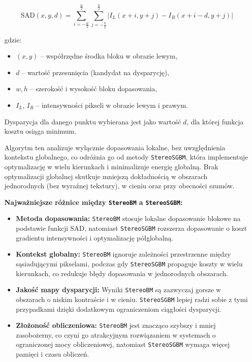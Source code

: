 \documentclass[magisterska]{pracadypl}
\begin{document}
\[
\text{SAD}(x,y,d) = \sum_{i=-\frac{w}{2}}^{\frac{w}{2}} \sum_{j=-\frac{h}{2}}^{\frac{h}{2}} | I_L(x+i,y+j) - I_R(x+i-d,y+j) |
\]

gdzie:
\begin{itemize}
    \item $(x,y)$ -- współrzędne środka bloku w obrazie lewym,
    \item $d$ -- wartość przesunięcia (kandydat na dysparycję),
    \item $w,h$ -- szerokość i wysokość bloku dopasowania,
    \item $I_L$, $I_R$ -- intensywności pikseli w obrazie lewym i prawym.
\end{itemize}

Dysparycja dla danego punktu wybierana jest jako wartość $d$, dla której funkcja kosztu osiąga minimum.  

Algorytm ten analizuje wyłącznie dopasowania lokalne, bez uwzględnienia kontekstu globalnego, co odróżnia go od metody \texttt{StereoSGBM}, która implementuje optymalizację w wielu kierunkach i minimalizuje energię globalną. Brak optymalizacji globalnej skutkuje mniejszą dokładnością w obszarach jednorodnych (bez wyraźnej tekstury), w cieniu oraz przy obecności szumów.  

\textbf{Najważniejsze różnice między \texttt{StereoBM} a \texttt{StereoSGBM}:}
\begin{itemize}
    \item \textbf{Metoda dopasowania:}  
    \texttt{StereoBM} stosuje lokalne dopasowanie blokowe na podstawie funkcji SAD, natomiast \texttt{StereoSGBM} rozszerza dopasowanie o koszt gradientu intensywności i optymalizację półglobalną.
    
    \item \textbf{Kontekst globalny:}  
    \texttt{StereoBM} ignoruje zależności przestrzenne między sąsiadującymi pikselami, podczas gdy \texttt{StereoSGBM} propaguje koszty w wielu kierunkach, co redukuje błędy dopasowania w jednorodnych obszarach.
    
    \item \textbf{Jakość mapy dysparycji:}  
    Wyniki \texttt{StereoBM} są zazwyczaj gorsze w obszarach o niskim kontraście i w cieniu. \texttt{StereoSGBM} lepiej radzi sobie z tymi przypadkami dzięki dodatkowym ograniczeniom ciągłości dysparycji.
    
    \item \textbf{Złożoność obliczeniowa:}  
    \texttt{StereoBM} jest znacząco szybszy i mniej zasobożerny, co czyni go atrakcyjnym rozwiązaniem w systemach o ograniczonej mocy obliczeniowej, natomiast \texttt{StereoSGBM} wymaga więcej pamięci i czasu obliczeń.
\end{itemize}
\end{document}
